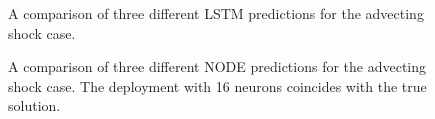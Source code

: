\documentclass[preprint,12pt]{elsarticle}
\begin{document}
\begin{figure}
	\centering
	\caption{A comparison of three different LSTM predictions for the advecting shock case.}
	\label{Figure5}
\end{figure}

\begin{figure}
	\centering
	\caption{A comparison of three different NODE predictions for the advecting shock case. The deployment with 16 neurons coincides with the true solution.}
	\label{Figure6}
\end{figure}
\end{document}
